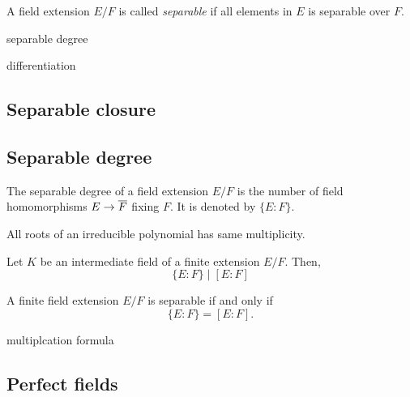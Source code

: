 \documentclass{../exp}
\begin{document}
\begin{defn}
A field extension $E/F$ is called \emph{separable} if all elements in $E$ is separable over $F$.
\end{defn}

separable degree

differentiation



\subsection{Separable closure}



\subsection{Separable degree}

\begin{thm}
The separable degree of a field extension $E/F$ is the number of field homomorphisms $E\to\cl F$ fixing $F$.
It is denoted by $\{E:F\}$.
\end{thm}

\begin{lem}
All roots of an irreducible polynomial has same multiplicity.
\end{lem}
\begin{pf}
\end{pf}

\begin{thm}
Let $K$ be an intermediate field of a finite extension $E/F$.
Then,
\[\{E:F\}\mid[E:F]\]
\end{thm}
\begin{pf}
\end{pf}

\begin{thm}
A finite field extension $E/F$ is separable if and only if
\[\{E:F\}=[E:F].\]
\end{thm}
\begin{pf}
\end{pf}


multiplcation formula





\subsection{Perfect fields}
\end{document}
